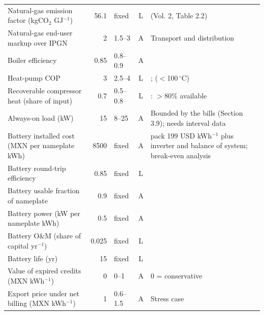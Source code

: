 {\begin{longtable}{p{4.4cm}rlcp{4.0cm}}
Natural-gas emission factor (kgCO$_2$ GJ$^{-1}$) & 56.1 & fixed & L & \citet{ipcc2006} (Vol. 2, Table 2.2) \\
Natural-gas end-user markup over IPGN & 2 & 1.5--3 & A & Transport and distribution \\
Boiler efficiency & 0.85 & 0.8--0.9 & A &  \\
Heat-pump COP & 3 & 2.5--4 & L & \citet{arpagaus2018}; \citet{schlosser2020} ($<$100\,$^\circ$C) \\
Recoverable compressor heat (share of input) & 0.7 & 0.5--0.8 & L & \citet{doe2016compressed}: $>$80\% available \\
Always-on load (kW) & 15 & 8--25 & A & Bounded by the bills (Section 3.9); needs interval data \\
Battery installed cost (MXN per nameplate kWh) & 8500 & fixed & A & \citet{nrel2024atb} pack 199 USD kWh$^{-1}$ plus inverter and balance of system; break-even analysis \\
Battery round-trip efficiency & 0.85 & fixed & L & \citet{nrel2024atb} \\
Battery usable fraction of nameplate & 0.9 & fixed & A &  \\
Battery power (kW per nameplate kWh) & 0.5 & fixed & A &  \\
Battery O\&M (share of capital yr$^{-1}$) & 0.025 & fixed & L & \citet{nrel2024atb} \\
Battery life (yr) & 15 & fixed & L & \citet{nrel2024atb} \\
Value of expired credits (MXN kWh$^{-1}$) & 0 & 0--1 & A & 0 = conservative \\
Export price under net billing (MXN kWh$^{-1}$) & 1 & 0.6--1.5 & A & Stress case \\
\bottomrule
\end{longtable}}
